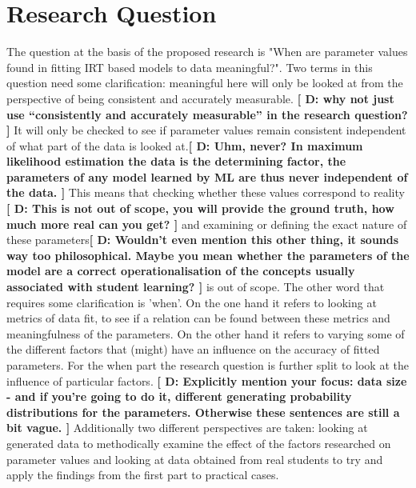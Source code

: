 \documentclass{scrartcl}
\providecommand{\comm}[1]{{\bf[ #1 ]}}
\providecommand{\commd}[1]{\comm{D: {#1}}}
\begin{document}
\section{Research Question}
\label{sec:RQ}
The question at the basis of the proposed research is "When are parameter values found in fitting IRT based models to data meaningful?". Two terms in this question need some clarification: meaningful here will only be looked at from the perspective of being consistent and accurately measurable. \commd{why not just use ``consistently and accurately measurable'' in the research question?} It will only be checked to see if parameter values remain consistent independent of what part of the data is looked at.\commd{Uhm, never? In maximum likelihood estimation the data is the determining factor, the parameters of any model learned by ML are thus never independent of the data.} This means that checking whether these values correspond to reality \commd{This is not out of scope, you will provide the ground truth, how much more real can you get?} and examining or defining the exact nature of these parameters\commd{Wouldn't even mention this other thing, it sounds way too philosophical. Maybe you mean whether the parameters of the model are a correct operationalisation of the concepts usually associated with student learning?} is out of scope. The other word that requires some clarification is 'when'. On the one hand it refers to looking at metrics of data fit, to see if a relation can be found between these metrics and meaningfulness of the parameters. On the other hand it refers to varying some of the different factors that (might) have an influence on the accuracy of fitted parameters. For the when part the research question is further split to look at the influence of particular factors. \commd{Explicitly mention your focus: data size - and if you're going to do it, different generating probability distributions for the parameters. Otherwise these sentences are still a bit vague.} Additionally two different perspectives are taken: looking at generated data to methodically examine the effect of the factors researched on parameter values and looking at data obtained from real students to try and apply the findings from the first part to practical cases.
\end{document}
